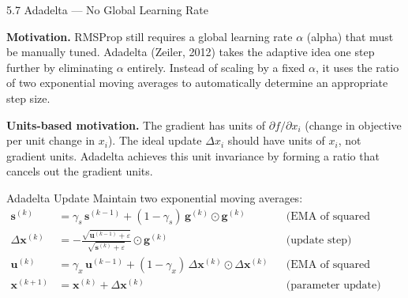 \documentclass[aspectratio=169,10pt]{beamer}
\newcommand{\vx}{\mathbf{x}}
\newcommand{\vg}{\mathbf{g}}
\newcommand{\vs}{\mathbf{s}}
\newcommand{\vu}{\mathbf{u}}
\begin{document}
\begin{frame}[allowframebreaks]{5.7 Adadelta --- No Global Learning Rate}

  \textbf{Motivation.}  RMSProp still requires a global learning
  rate $\alpha$ (alpha) that must be manually tuned.  Adadelta
  (Zeiler, 2012) takes the adaptive idea one step further by
  eliminating $\alpha$ entirely.  Instead of scaling by a
  fixed $\alpha$, it uses the ratio of two exponential moving
  averages to automatically determine an appropriate step size.

  \vspace{0.5em}
  \textbf{Units-based motivation.}  The gradient has units
  of $\partial f / \partial x_i$ (change in objective per
  unit change in $x_i$).  The ideal update $\Delta x_i$ should
  have units of $x_i$, not gradient units.  Adadelta achieves
  this unit invariance by forming a ratio that cancels out the
  gradient units.

  \begin{block}{Adadelta Update}
    Maintain two exponential moving averages:
    \begin{align*}
      \vs^{(k)} &= \gamma_s\,\vs^{(k-1)}
                  + (1-\gamma_s)\,\vg^{(k)}\!\odot\!\vg^{(k)}
                  &&\text{(EMA of squared gradients)}\\[4pt]
      \Delta\vx^{(k)} &= -\frac{\sqrt{\vu^{(k-1)}+\varepsilon}}
                                {\sqrt{\vs^{(k)}+\varepsilon}}
                          \odot\vg^{(k)}
                  &&\text{(update step)}\\[4pt]
      \vu^{(k)} &= \gamma_x\,\vu^{(k-1)}
                  + (1-\gamma_x)\,\Delta\vx^{(k)}\!\odot\!\Delta\vx^{(k)}
                  &&\text{(EMA of squared updates)}\\[4pt]
      \vx^{(k+1)} &= \vx^{(k)} + \Delta\vx^{(k)}
                  &&\text{(parameter update)}
    \end{align*}
  \end{block}

  \framebreak


\end{frame}
\end{document}
